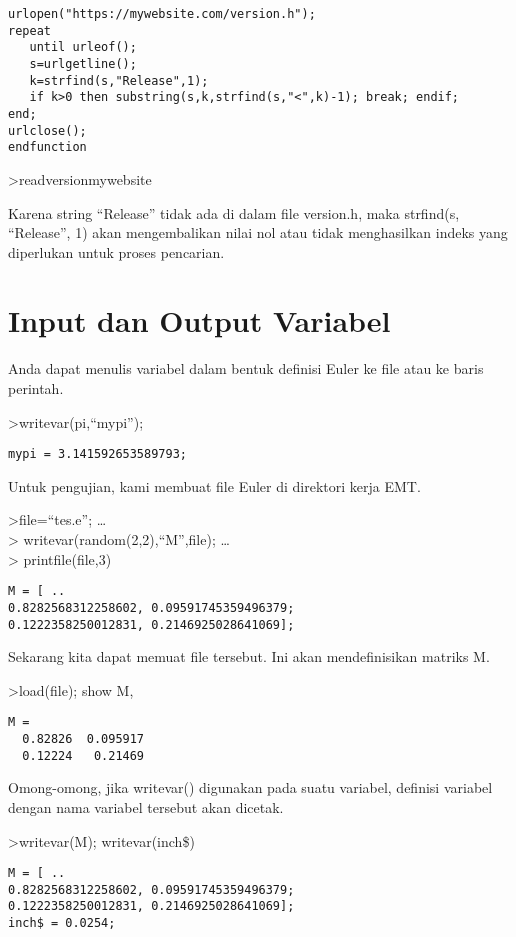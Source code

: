 \documentclass[
]{book}
\begin{document}
\begin{verbatim}
urlopen("https://mywebsite.com/version.h");
repeat
   until urleof();
   s=urlgetline();
   k=strfind(s,"Release",1);
   if k>0 then substring(s,k,strfind(s,"<",k)-1); break; endif;
end;
urlclose();
endfunction
\end{verbatim}

\textgreater readversionmywebsite

Karena string ``Release'' tidak ada di dalam file version.h, maka strfind(s, ``Release'', 1) akan mengembalikan nilai nol atau tidak menghasilkan indeks yang diperlukan untuk proses pencarian.

\chapter{Input dan Output Variabel}\label{input-dan-output-variabel}

Anda dapat menulis variabel dalam bentuk definisi Euler ke file atau ke baris perintah.

\textgreater writevar(pi,``mypi'');

\begin{verbatim}
mypi = 3.141592653589793;
\end{verbatim}

Untuk pengujian, kami membuat file Euler di direktori kerja EMT.

\textgreater file=``tes.e''; \ldots{}\\
\textgreater{} writevar(random(2,2),``M'',file); \ldots{}\\
\textgreater{} printfile(file,3)

\begin{verbatim}
M = [ ..
0.8282568312258602, 0.09591745359496379;
0.1222358250012831, 0.2146925028641069];
\end{verbatim}

Sekarang kita dapat memuat file tersebut. Ini akan mendefinisikan matriks M.

\textgreater load(file); show M,

\begin{verbatim}
M = 
  0.82826  0.095917 
  0.12224   0.21469 
\end{verbatim}

Omong-omong, jika writevar() digunakan pada suatu variabel, definisi variabel dengan nama variabel tersebut akan dicetak.

\textgreater writevar(M); writevar(inch\$)

\begin{verbatim}
M = [ ..
0.8282568312258602, 0.09591745359496379;
0.1222358250012831, 0.2146925028641069];
inch$ = 0.0254;
\end{verbatim}
\end{document}

